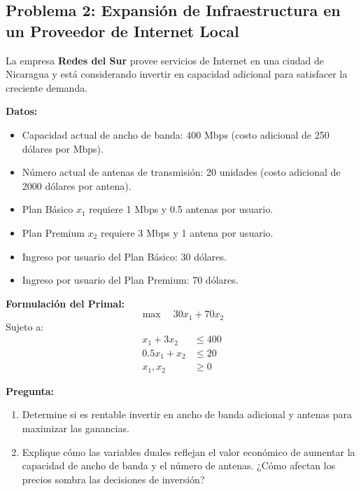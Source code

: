 \documentclass{article}
\begin{document}
\begin{problem}
\subsection*{Problema 2: Expansión de Infraestructura en un Proveedor de Internet Local}

La empresa \textbf{Redes del Sur} provee servicios de Internet en una ciudad de Nicaragua y está considerando invertir en capacidad adicional para satisfacer la creciente demanda.

\textbf{Datos:}
\begin{itemize}
    \item Capacidad actual de ancho de banda: 400 Mbps (costo adicional de 250 dólares por Mbps).
    \item Número actual de antenas de transmisión: 20 unidades (costo adicional de 2000 dólares por antena).
    \item Plan Básico \( x_1 \) requiere 1 Mbps y 0.5 antenas por usuario.
    \item Plan Premium \( x_2 \) requiere 3 Mbps y 1 antena por usuario.
    \item Ingreso por usuario del Plan Básico: 30 dólares.
    \item Ingreso por usuario del Plan Premium: 70 dólares.
\end{itemize}

\textbf{Formulación del Primal:}
\[
\max \quad 30x_1 + 70x_2
\]
Sujeto a:
\[
\begin{aligned}
    x_1 + 3x_2 &\leq 400 \\
    0.5x_1 + x_2 &\leq 20 \\
    x_1, x_2 &\geq 0
\end{aligned}
\]

\textbf{Pregunta:}
\begin{enumerate}
    \item Determine si es rentable invertir en ancho de banda adicional y antenas para maximizar las ganancias.
    \item Explique cómo las variables duales reflejan el valor económico de aumentar la capacidad de ancho de banda y el número de antenas. ¿Cómo afectan los precios sombra las decisiones de inversión?
\end{enumerate}

\end{problem}
\end{document}
